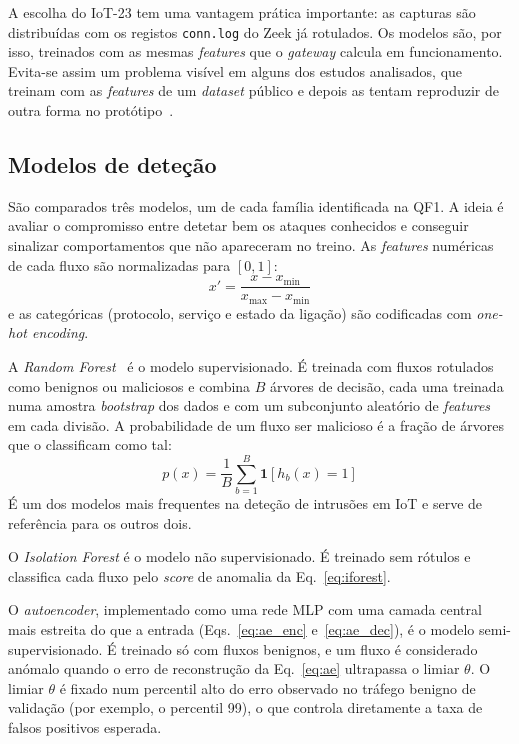 \documentclass[conference,a4paper]{IEEEtran}
\begin{document}
A escolha do IoT-23 tem uma vantagem prática importante: as capturas são distribuídas
com os registos \texttt{conn.log} do Zeek já rotulados. Os modelos são, por isso,
treinados com as mesmas \textit{features} que o \textit{gateway} calcula em
funcionamento. Evita-se assim um problema visível em alguns dos estudos analisados, que
treinam com as \textit{features} de um \textit{dataset} público e depois as tentam
reproduzir de outra forma no protótipo~\cite{elsayed2024mpguard}.

\subsection{Modelos de deteção}
São comparados três modelos, um de cada família identificada na QF1. A ideia é avaliar o
compromisso entre detetar bem os ataques conhecidos e conseguir sinalizar
comportamentos que não apareceram no treino. As \textit{features} numéricas de cada
fluxo são normalizadas para $[0,1]$:
\begin{equation}
x' = \frac{x - x_{\min}}{x_{\max} - x_{\min}}
\label{eq:minmax}
\end{equation}
e as categóricas (protocolo, serviço e estado da ligação) são codificadas com
\textit{one-hot encoding}.

A \textit{Random Forest}~\cite{breiman2001random} é o modelo supervisionado. É treinada
com fluxos rotulados como benignos ou maliciosos e combina $B$ árvores de decisão,
cada uma treinada numa amostra \textit{bootstrap} dos dados e com um subconjunto
aleatório de \textit{features} em cada divisão. A probabilidade de um fluxo ser
malicioso é a fração de árvores que o classificam como tal:
\begin{equation}
p(x) = \frac{1}{B}\sum_{b=1}^{B} \mathbf{1}\left[h_b(x) = 1\right]
\label{eq:rf}
\end{equation}
É um dos modelos mais frequentes na deteção de intrusões em IoT e serve de referência
para os outros dois.

O \textit{Isolation Forest} é o modelo não supervisionado. É treinado sem rótulos e
classifica cada fluxo pelo \textit{score} de anomalia da Eq.~\ref{eq:iforest}.

O \textit{autoencoder}, implementado como uma rede MLP com uma camada central mais
estreita do que a entrada (Eqs.~\ref{eq:ae_enc} e~\ref{eq:ae_dec}), é o modelo
semi-supervisionado. É treinado só com fluxos benignos, e um fluxo é considerado anómalo
quando o erro de reconstrução da Eq.~\ref{eq:ae} ultrapassa o limiar $\theta$. O limiar $\theta$ é fixado num percentil alto do erro observado no tráfego benigno de
validação (por exemplo, o percentil 99), o que controla diretamente a taxa de falsos
positivos esperada.
\end{document}
